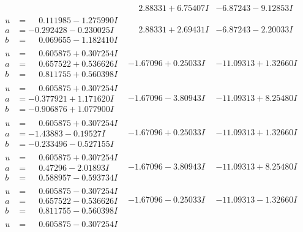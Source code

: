\documentclass[1p]{elsarticle_modified}
\theoremstyle{definition}
\begin{document}
$$\begin{array}{c|c|c}
 & \phantom{-}2.88331 + 6.75407 I & -6.87243 - 9.12853 I \\ \hline\begin{aligned}
u &= \phantom{-}0.111985 - 1.275990 I \\
a &= -0.292428 - 0.230025 I \\
b &= \phantom{-}0.069655 - 1.182410 I\end{aligned}
 & \phantom{-}2.88331 + 2.69431 I & -6.87243 - 2.20033 I \\ \hline\begin{aligned}
u &= \phantom{-}0.605875 + 0.307254 I \\
a &= \phantom{-}0.657522 + 0.536626 I \\
b &= \phantom{-}0.811755 + 0.560398 I\end{aligned}
 & -1.67096 + 0.25033 I & -11.09313 + 1.32660 I \\ \hline\begin{aligned}
u &= \phantom{-}0.605875 + 0.307254 I \\
a &= -0.377921 + 1.171620 I \\
b &= -0.906876 + 1.077900 I\end{aligned}
 & -1.67096 - 3.80943 I & -11.09313 + 8.25480 I \\ \hline\begin{aligned}
u &= \phantom{-}0.605875 + 0.307254 I \\
a &= -1.43883 - 0.19527 I \\
b &= -0.233496 - 0.527155 I\end{aligned}
 & -1.67096 + 0.25033 I & -11.09313 + 1.32660 I \\ \hline\begin{aligned}
u &= \phantom{-}0.605875 + 0.307254 I \\
a &= \phantom{-}0.47296 - 2.01893 I \\
b &= \phantom{-}0.588957 - 0.593734 I\end{aligned}
 & -1.67096 - 3.80943 I & -11.09313 + 8.25480 I \\ \hline\begin{aligned}
u &= \phantom{-}0.605875 - 0.307254 I \\
a &= \phantom{-}0.657522 - 0.536626 I \\
b &= \phantom{-}0.811755 - 0.560398 I\end{aligned}
 & -1.67096 - 0.25033 I & -11.09313 - 1.32660 I \\ \hline\begin{aligned}
u &= \phantom{-}0.605875 - 0.307254 I \\

\end{aligned}
\end{array}$$
\end{document}
